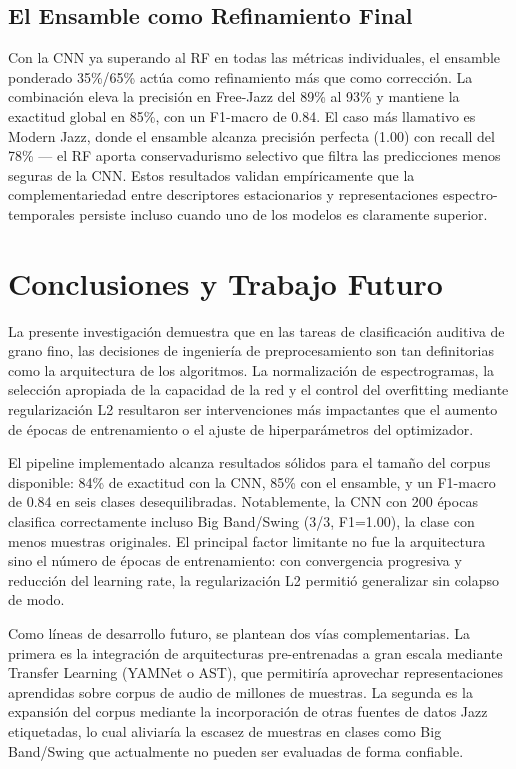 \documentclass[conference]{IEEEtran}
\begin{document}
\subsection{El Ensamble como Refinamiento Final}
Con la CNN ya superando al RF en todas las métricas individuales, el ensamble ponderado 35\%/65\% actúa como refinamiento más que como corrección. La combinación eleva la precisión en Free-Jazz del 89\% al 93\% y mantiene la exactitud global en 85\%, con un F1-macro de 0.84. El caso más llamativo es Modern Jazz, donde el ensamble alcanza precisión perfecta (1.00) con recall del 78\% — el RF aporta conservadurismo selectivo que filtra las predicciones menos seguras de la CNN. Estos resultados validan empíricamente que la complementariedad entre descriptores estacionarios y representaciones espectro-temporales persiste incluso cuando uno de los modelos es claramente superior.

\section{Conclusiones y Trabajo Futuro}

La presente investigación demuestra que en las tareas de clasificación auditiva de grano fino, las decisiones de ingeniería de preprocesamiento son tan definitorias como la arquitectura de los algoritmos. La normalización de espectrogramas, la selección apropiada de la capacidad de la red y el control del overfitting mediante regularización L2 resultaron ser intervenciones más impactantes que el aumento de épocas de entrenamiento o el ajuste de hiperparámetros del optimizador.

El pipeline implementado alcanza resultados sólidos para el tamaño del corpus disponible: 84\% de exactitud con la CNN, 85\% con el ensamble, y un F1-macro de 0.84 en seis clases desequilibradas. Notablemente, la CNN con 200 épocas clasifica correctamente incluso Big Band/Swing (3/3, F1=1.00), la clase con menos muestras originales. El principal factor limitante no fue la arquitectura sino el número de épocas de entrenamiento: con convergencia progresiva y reducción del learning rate, la regularización L2 permitió generalizar sin colapso de modo.

Como líneas de desarrollo futuro, se plantean dos vías complementarias. La primera es la integración de arquitecturas pre-entrenadas a gran escala mediante Transfer Learning (YAMNet o AST), que permitiría aprovechar representaciones aprendidas sobre corpus de audio de millones de muestras. La segunda es la expansión del corpus mediante la incorporación de otras fuentes de datos Jazz etiquetadas, lo cual aliviaría la escasez de muestras en clases como Big Band/Swing que actualmente no pueden ser evaluadas de forma confiable.
\end{document}
